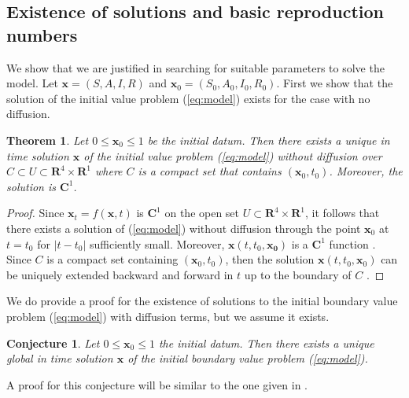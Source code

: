 \documentclass[11pt]{article}
\newcommand{\R}{\mathbf{R}}
\newcommand{\C}{\mathbf{C}}
\renewcommand\vec{\mathbf}
\newtheorem{theorem}{Theorem}
\newtheorem{conjecture}{Conjecture}
\begin{document}
	\subsection{Existence of solutions and basic reproduction numbers}
		We show that we are justified in searching for suitable parameters to solve the model.
		Let $\vec{x} = (S, A, I, R)$ and $\vec{x}_0 = (S_0, A_0, I_0, R_0)$.
		First we show that the solution of the initial value problem (\ref{eq:model}) exists for the case with no diffusion.
		\begin{theorem}
			Let $0 \leq \vec{x}_0 \leq 1$ be the initial datum.
			Then there exists a unique in time solution $\vec{x}$ of the initial value problem (\ref{eq:model}) without diffusion over $C \subset U \subset \R^4 \times \R^1$ where $C$ is a compact set that contains $(\vec{x}_0, t_0)$.
			Moreover, the solution is $\C^1$.
		\end{theorem}
		\begin{proof}
			Since $\vec{x}_t = f(\vec{x},t)$ is $\C^1$ on the open set $U \subset \R^4 \times \R^1$, it follows that there exists a solution of (\ref{eq:model}) without diffusion through the point $\vec{x}_0$ at $t = t_0$ for $|t - t_0|$ sufficiently small.
			Moreover, $\vec{x} (t, t_0,\vec{x_0})$ is a $\C^1$ function \cite{dynamics}.
			Since $C$ is a compact set containing $(\vec{x}_0, t_0)$, then the solution $\vec{x} (t, t_0, \vec{x}_0)$ can be uniquely extended backward and forward in $t$ up to the boundary of $C$ \cite{dynamics}.
		\end{proof}
		\noindent We do provide a proof for the existence of solutions to the initial boundary value problem (\ref{eq:model}) with diffusion terms, but we assume it exists.
		\begin{conjecture}
			Let $0 \leq \vec{x}_0 \leq 1$ the initial datum.
			Then there exists a unique global in time solution $\vec{x}$ of the initial boundary value problem (\ref{eq:model}).
		\end{conjecture}
		\noindent A proof for this conjecture will be similar to the one given in \cite{Mammeri+2020+102+113}.
		
\end{document}

